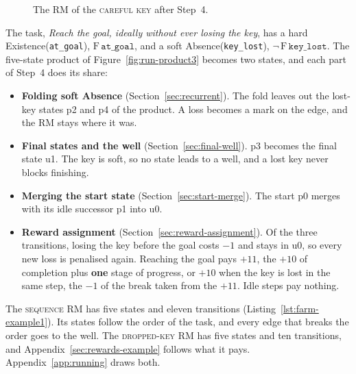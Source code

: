 \documentclass[11pt,english,listoffigures,listoftables]{tfgetsinf}
\newcommand{\runex}[1]{\textsc{#1}}  %
\newcommand{\gain}[1]{\textcolor{green!40!black}{\bfseries\boldmath #1}}  %
\newcommand{\loss}[1]{\textcolor{red!60!black}{\bfseries\boldmath #1}}  %
\begin{document}
\begin{figure}[H]
\centering
{}
\caption[RM of the \runex{careful key}]{The RM of the \runex{careful key} after Step~4.}
\label{fig:ex3-rm}
\end{figure}

The task, \textit{Reach the goal, ideally without ever losing the key}, has a hard Existence(\texttt{at\_goal}), $\mathrm{F}\,\texttt{at\_goal}$, and a soft Absence(\texttt{key\_lost}), $\neg\,\mathrm{F}\,\texttt{key\_lost}$. The five-state product of Figure~\ref{fig:run-product3} becomes two states, and each part of Step~4 does its share:
\begin{itemize}
    \item \textbf{Folding soft Absence} (Section~\ref{sec:recurrent}). The fold leaves out the lost-key states p2 and p4 of the product. A loss becomes a mark on the edge, and the RM stays where it was.
    \item \textbf{Final states and the well} (Section~\ref{sec:final-well}). p3 becomes the final state u1. The key is soft, so no state leads to a well, and a lost key never blocks finishing.
    \item \textbf{Merging the start state} (Section~\ref{sec:start-merge}). The start p0 merges with its idle successor p1 into u0.
    \item \textbf{Reward assignment} (Section~\ref{sec:reward-assignment}). Of the three transitions, losing the key before the goal costs \loss{$-1$} and stays in u0, so every new loss is penalised again. Reaching the goal pays \gain{$+11$}, the \gain{$+10$} of completion plus \gain{one} stage of progress, or \gain{$+10$} when the key is lost in the same step, the \loss{$-1$} of the break taken from the $+11$. Idle steps pay nothing.
\end{itemize}

The \runex{sequence} RM has five states and eleven transitions (Listing~\ref{lst:farm-example1}). Its states follow the order of the task, and every edge that breaks the order goes to the well. The \runex{dropped-key} RM has five states and ten transitions, and Appendix~\ref{sec:rewards-example} follows what it pays. Appendix~\ref{app:running} draws both.
\end{document}
